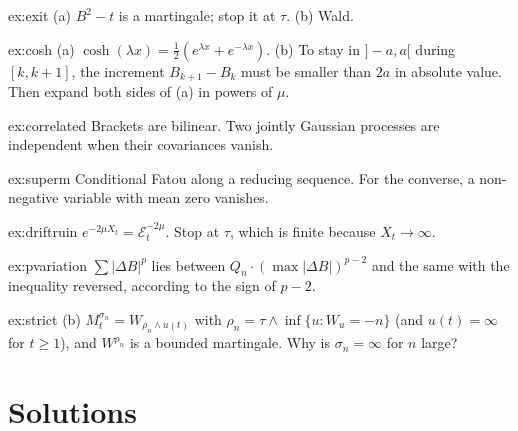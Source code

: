 \begin{hint}{ex:exit}
(a) $B^2-t$ is a martingale; stop it at $\tau$. (b) Wald.
\end{hint}

\begin{hint}{ex:cosh}
(a) $\cosh(\lambda x)=\frac12(e^{\lambda x}+e^{-\lambda x})$. (b) To stay in $]-a,a[$ during $[k,k+1]$, the increment $B_{k+1}-B_k$ must be smaller than $2a$ in absolute value. Then expand both sides of (a) in powers of $\mu$.
\end{hint}

\begin{hint}{ex:correlated}
Brackets are bilinear. Two jointly Gaussian processes are independent when their covariances vanish.
\end{hint}

\begin{hint}{ex:superm}
Conditional Fatou along a reducing sequence. For the converse, a non-negative variable with mean zero vanishes.
\end{hint}

\begin{hint}{ex:driftruin}
$e^{-2\mu X_t}=\mathcal E^{-2\mu}_t$. Stop at $\tau$, which is finite because $X_t\to\infty$.
\end{hint}

\begin{hint}{ex:pvariation}
$\sum|\Delta B|^p$ lies between $Q_n\cdot(\max|\Delta B|)^{p-2}$ and the same with the inequality reversed, according to the sign of $p-2$.
\end{hint}

\begin{hint}{ex:strict}
(b) $M^{\sigma_n}_t=W_{\rho_n\wedge u(t)}$ with $\rho_n=\tau\wedge\inf\{u:W_u=-n\}$ (and $u(t)=\infty$ for $t\ge1$), and $W^{\rho_n}$ is a bounded martingale. Why is $\sigma_n=\infty$ for $n$ large?
\end{hint}

\section{Solutions}

